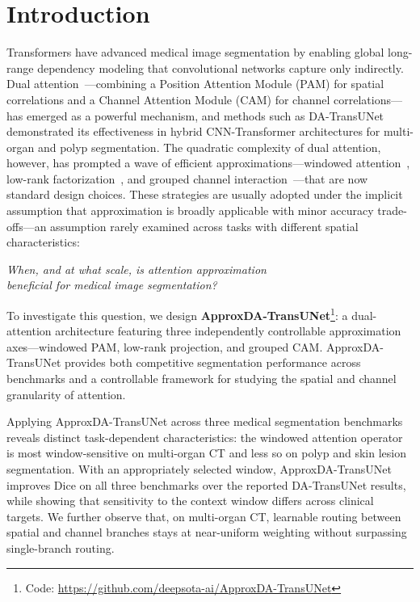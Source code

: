 \section{Introduction}

Transformers have advanced medical image segmentation by enabling global long-range dependency modeling that convolutional networks capture only indirectly. Dual attention~\cite{fu2019dual}---combining a Position Attention Module (PAM) for spatial correlations and a Channel Attention Module (CAM) for channel correlations---has emerged as a powerful mechanism, and methods such as DA-TransUNet~\cite{sun2024datransunet} demonstrated its effectiveness in hybrid CNN-Transformer architectures for multi-organ and polyp segmentation. The quadratic complexity of dual attention, however, has prompted a wave of efficient approximations---windowed attention~\cite{liu2021swin}, low-rank factorization~\cite{wang2020linformer}, and grouped channel interaction~\cite{rahman2024emcad}---that are now standard design choices. These strategies are usually adopted under the implicit assumption that approximation is broadly applicable with minor accuracy trade-offs---an assumption rarely examined across tasks with different spatial characteristics:

\begin{center}
\emph{When, and at what scale, is attention approximation\\
beneficial for medical image segmentation?}
\end{center}
To investigate this question, we design \textbf{ApproxDA-TransUNet}\footnote{Code: \url{https://github.com/deepsota-ai/ApproxDA-TransUNet}}: a dual-attention architecture featuring three independently controllable approximation axes---windowed PAM, low-rank projection, and grouped CAM. ApproxDA-TransUNet provides both competitive segmentation performance across benchmarks and a controllable framework for studying the spatial and channel granularity of attention.

Applying ApproxDA-TransUNet across three medical segmentation benchmarks reveals distinct task-dependent characteristics: the windowed attention operator is most window-sensitive on multi-organ CT and less so on polyp and skin lesion segmentation. With an appropriately selected window, ApproxDA-TransUNet improves Dice on all three benchmarks over the reported DA-TransUNet results, while showing that sensitivity to the context window differs across clinical targets. We further observe that, on multi-organ CT, learnable routing between spatial and channel branches stays at near-uniform weighting without surpassing single-branch routing.

